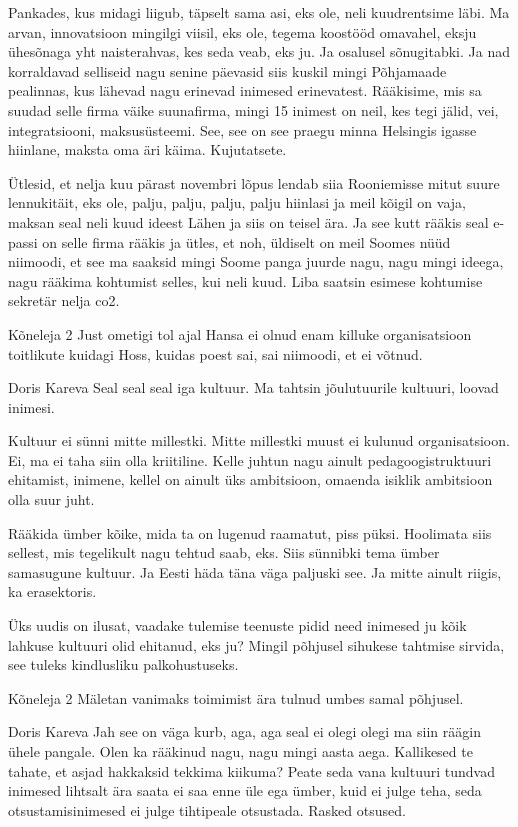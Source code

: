Pankades, kus midagi liigub, täpselt sama asi, eks ole, neli kuudrentsime läbi. Ma arvan, innovatsioon mingilgi viisil, eks ole, tegema koostööd omavahel, eksju ühesõnaga yht naisterahvas, kes seda veab, eks ju. Ja osalusel sõnugitabki. Ja nad korraldavad selliseid nagu senine päevasid siis kuskil mingi Põhjamaade pealinnas, kus lähevad nagu erinevad inimesed erinevatest. Rääkisime, mis sa suudad selle firma väike suunafirma, mingi 15 inimest on neil, kes tegi jälid, vei, integratsiooni, maksusüsteemi. See, see on see praegu minna Helsingis igasse hiinlane, maksta oma äri käima. Kujutatsete. 

Ütlesid, et nelja kuu pärast novembri lõpus lendab siia Rooniemisse mitut suure lennukitäit, eks ole, palju, palju, palju, palju hiinlasi ja meil kõigil on vaja, maksan seal neli kuud ideest Lähen ja siis on teisel ära. Ja see kutt rääkis seal e-passi on selle firma rääkis ja ütles, et noh, üldiselt on meil Soomes nüüd niimoodi, et see ma saaksid mingi Soome panga juurde nagu, nagu mingi ideega, nagu rääkima kohtumist selles, kui neli kuud. Liba saatsin esimese kohtumise sekretär nelja co2. 

Kõneleja 2
Just ometigi tol ajal Hansa ei olnud enam killuke organisatsioon toitlikute kuidagi Hoss, kuidas poest sai, sai niimoodi, et ei võtnud. 

Doris Kareva
Seal seal seal iga kultuur. Ma tahtsin jõulutuurile kultuuri, loovad inimesi. 

Kultuur ei sünni mitte millestki. Mitte millestki muust ei kulunud organisatsioon. Ei, ma ei taha siin olla kriitiline. Kelle juhtun nagu ainult pedagoogistruktuuri ehitamist, inimene, kellel on ainult üks ambitsioon, omaenda isiklik ambitsioon olla suur juht. 

Rääkida ümber kõike, mida ta on lugenud raamatut, piss püksi. Hoolimata siis sellest, mis tegelikult nagu tehtud saab, eks. Siis sünnibki tema ümber samasugune kultuur. Ja Eesti häda täna väga paljuski see. Ja mitte ainult riigis, ka erasektoris. 

Üks uudis on ilusat, vaadake tulemise teenuste pidid need inimesed ju kõik lahkuse kultuuri olid ehitanud, eks ju? Mingil põhjusel sihukese tahtmise sirvida, see tuleks kindlusliku palkohustuseks. 

Kõneleja 2
Mäletan vanimaks toimimist ära tulnud umbes samal põhjusel. 

Doris Kareva
Jah see on väga kurb, aga, aga seal ei olegi olegi ma siin räägin ühele pangale. Olen ka rääkinud nagu, nagu mingi aasta aega. Kallikesed te tahate, et asjad hakkaksid tekkima kiikuma? Peate seda vana kultuuri tundvad inimesed lihtsalt ära saata ei saa enne üle ega ümber, kuid ei julge teha, seda otsustamisinimesed ei julge tihtipeale otsustada. Rasked otsused. 

